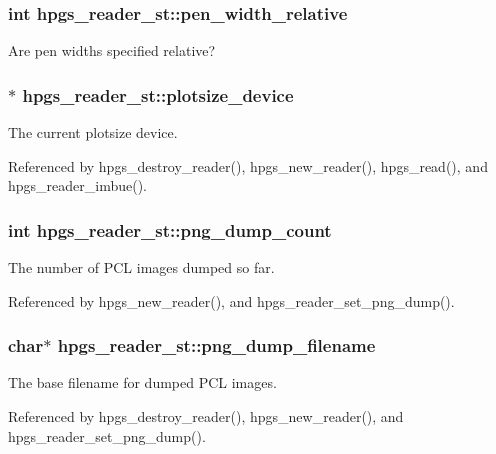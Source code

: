 \subsubsection[{pen\_\-width\_\-relative}]{\setlength{\rightskip}{0pt plus 5cm}int {\bf hpgs\_\-reader\_\-st::pen\_\-width\_\-relative}}\label{structhpgs__reader__st_a383155685b823031c197d401e9da4519}
Are pen widths specified relative? 
\subsubsection[{plotsize\_\-device}]{$\ast$ {\bf hpgs\_\-reader\_\-st::plotsize\_\-device}}\label{structhpgs__reader__st_a0c17198587a3b759bf04fef35a687dbf}
The current plotsize device. 

Referenced by hpgs\_\-destroy\_\-reader(), hpgs\_\-new\_\-reader(), hpgs\_\-read(), and hpgs\_\-reader\_\-imbue().

\subsubsection[{png\_\-dump\_\-count}]{\setlength{\rightskip}{0pt plus 5cm}int {\bf hpgs\_\-reader\_\-st::png\_\-dump\_\-count}}\label{structhpgs__reader__st_a3943aa511e5cc534061bec0511dd2003}
The number of PCL images dumped so far. 

Referenced by hpgs\_\-new\_\-reader(), and hpgs\_\-reader\_\-set\_\-png\_\-dump().

\subsubsection[{png\_\-dump\_\-filename}]{\setlength{\rightskip}{0pt plus 5cm}char$\ast$ {\bf hpgs\_\-reader\_\-st::png\_\-dump\_\-filename}}\label{structhpgs__reader__st_a77896d1ba452a75ae0e26f02a1bd3b50}
The base filename for dumped PCL images. 

Referenced by hpgs\_\-destroy\_\-reader(), hpgs\_\-new\_\-reader(), and hpgs\_\-reader\_\-set\_\-png\_\-dump().

